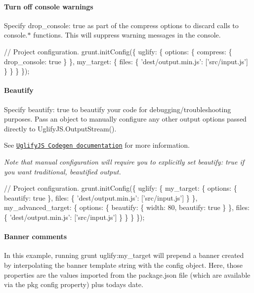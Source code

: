 \paragraph*{Turn off console warnings}

Specify {\ttfamily drop\+\_\+console\+: true} as part of the {\ttfamily compress} options to discard calls to {\ttfamily console.$\ast$} functions. This will suppress warning messages in the console.


\begin{DoxyCode}
// Project configuration.
grunt.initConfig(\{
  uglify: \{
    options: \{
      compress: \{
        drop\_console: true
      \}
    \},
    my\_target: \{
      files: \{
        'dest/output.min.js': ['src/input.js']
      \}
    \}
  \}
\});
\end{DoxyCode}


\paragraph*{Beautify}

Specify {\ttfamily beautify\+: true} to beautify your code for debugging/troubleshooting purposes. Pass an object to manually configure any other output options passed directly to {\ttfamily Uglify\+J\+S.\+Output\+Stream()}.

See \href{http://lisperator.net/uglifyjs/codegen}{\tt Uglify\+JS Codegen documentation} for more information.

{\itshape Note that manual configuration will require you to explicitly set {\ttfamily beautify\+: true} if you want traditional, beautified output.}


\begin{DoxyCode}
// Project configuration.
grunt.initConfig(\{
  uglify: \{
    my\_target: \{
      options: \{
        beautify: true
      \},
      files: \{
        'dest/output.min.js': ['src/input.js']
      \}
    \},
    my\_advanced\_target: \{
      options: \{
        beautify: \{
          width: 80,
          beautify: true
        \}
      \},
      files: \{
        'dest/output.min.js': ['src/input.js']
      \}
    \}
  \}
\});
\end{DoxyCode}


\paragraph*{Banner comments}

In this example, running {\ttfamily grunt uglify\+:my\+\_\+target} will prepend a banner created by interpolating the {\ttfamily banner} template string with the config object. Here, those properties are the values imported from the {\ttfamily package.\+json} file (which are available via the {\ttfamily pkg} config property) plus today\textquotesingle{}s date.

